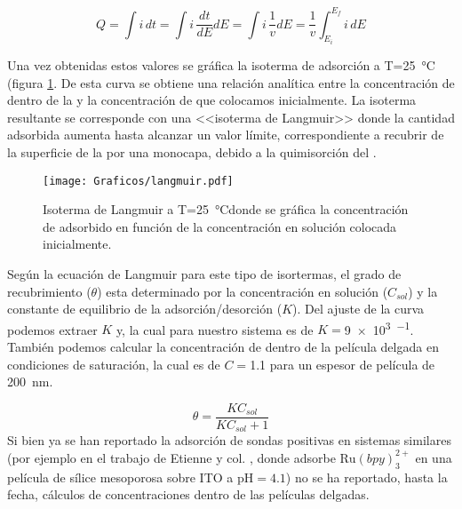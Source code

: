 			\begin{equation}
					Q=\int i\,dt = \int i\, \frac{dt}{dE} dE = \int i\,\frac{1}{v}dE=\frac{1}{v}\int_{E_{i}}^{E_{f}} i\,dE
					\label{eq:carga}
			\end{equation}

		Una vez obtenidas estos valores se gráfica la isoterma de adsorción a T=\SI{25}{\celsius} (figura \ref{fig:langmuir}. De esta curva se obtiene una relación analítica entre la concentración de \ru\space dentro de la \pdm\space y la concentración de \ru{\ru}\space que colocamos inicialmente. La isoterma resultante se corresponde con una <<isoterma de Langmuir>> donde la cantidad adsorbida aumenta hasta alcanzar un valor límite, correspondiente a recubrir de la superficie de la \pdm por una monocapa, debido a la quimisorción del \ru.\cite{langmuir1918}

			\begin{figure}[ht]
					\centering
			 	    \texttt{[image: Graficos/langmuir.pdf]}
			        \caption[Isoterma de Langmuir]{Isoterma de Langmuir a T=\SI{25}{\celsius}donde se gráfica la concentración de \aminorutenio\space adsorbido en función de la concentración en solución colocada inicialmente.}
			        \label{fig:langmuir}
			      	\end{figure} 	
	
		Según la ecuación de Langmuir para este tipo de isortermas, el grado de recubrimiento ($\theta$) esta determinado por la concentración en solución ($C_{sol}$) y la constante de equilibrio de la adsorción/desorción ($K$). Del ajuste de la curva podemos extraer $K$ y, la cual para nuestro sistema es de $K=$\SI{9e3}{\Molar^{-1}}. También podemos calcular la concentración de \ru\space dentro de la película delgada en condiciones de saturación, la cual es de $C=$\SI{1.1}{\Molar} para un espesor de película de \SI{200}{nm}.

			\begin{equation}
					\theta = \frac{KC_{sol}}{KC_{sol}+1}
					\label{eq:langmuir}
			\end{equation}
		Si bien ya se han reportado la adsorción de sondas positivas en sistemas similares (por ejemplo en el trabajo de Etienne y col. \cite{Etienne2007}, donde adsorbe $\text{Ru}(bpy)_3^{2+}$ en una película de sílice mesoporosa sobre ITO a $\text{pH}=4.1$) no se ha reportado, hasta la fecha, cálculos de concentraciones dentro de las películas delgadas.

